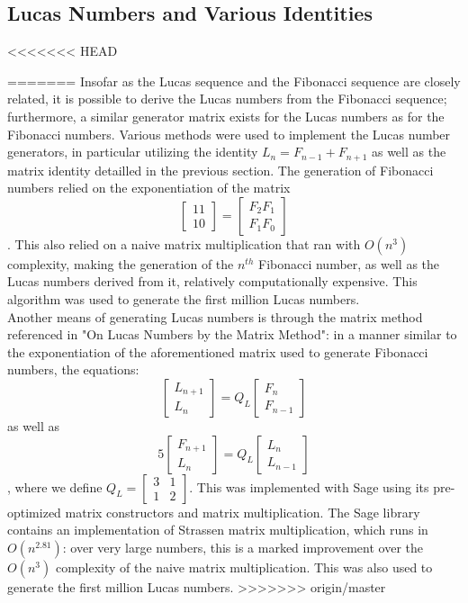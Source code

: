 \documentclass[11pt]{article}
\begin{document}
\subsection{Lucas Numbers and Various Identities}
<<<<<<< HEAD

=======
Insofar as the Lucas sequence and the Fibonacci sequence are closely related, it is possible to derive the Lucas numbers from the Fibonacci sequence; furthermore, a similar generator matrix exists for the Lucas numbers as for the Fibonacci numbers. Various methods were used to implement the Lucas number generators, in particular utilizing the identity $L_{n} = F_{n-1} + F_{n+1}$ as well as the matrix identity detailled in the previous section. The generation of Fibonacci numbers relied on the exponentiation of the matrix \[
\begin{bmatrix}
1 1\\
1 0
\end{bmatrix} =  \begin{bmatrix} 
	F_{2} F_{1} \\
	F_{1} F_{0}
	
\end{bmatrix}
\] . This also relied on a naive matrix multiplication that ran with $O(n^{3})$ complexity, making the generation of the $n^{th}$ Fibonacci number, as well as the Lucas numbers derived from it, relatively  computationally expensive. This algorithm was used to generate the first million Lucas numbers.\\
Another means of generating Lucas numbers is through the matrix method referenced in "On Lucas Numbers by the Matrix Method": in a manner similar to the exponentiation of the aforementioned matrix used to generate Fibonacci numbers, the equations:
\[
\begin{bmatrix}
L_{n+1} \\
L_{n}
\end{bmatrix} = Q_{L} \begin{bmatrix} F_{n} \\ F_{n-1}\end{bmatrix}
\] 
as well as \\
\[
5\begin{bmatrix}
F_{n+1} \\
L_{n}
\end{bmatrix} = Q_{L} \begin{bmatrix} L_{n} \\ L_{n-1}\end{bmatrix}
\] , where we define $Q_{L} = \begin{bmatrix} 3 & 1 \\ 1 & 2 \end{bmatrix}$. This was implemented with Sage using its pre-optimized matrix constructors and matrix multiplication. The Sage library contains an implementation of Strassen matrix multiplication, which runs in $O(n^{2.81})$: over very large numbers, this is a marked improvement over the $O(n^{3})$ complexity of the naive matrix multiplication. This was also used to generate the first million Lucas numbers.
>>>>>>> origin/master
\end{document}
